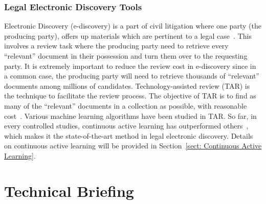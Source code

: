 \documentclass{svjour3}
\theoremstyle{break}
\begin{document}
\subsubsection{Legal Electronic Discovery Tools}
\label{sect: Electronic Discovery}

Electronic Discovery (e-discovery) is a part of civil litigation where one party (the producing party), offers up materials which are pertinent to a legal case~\cite{krishna2016bigse}. This involves a review task where the producing party need to retrieve every ``relevant'' document in their possession and turn them over to the requesting party. It is extremely important to reduce the review cost in e-discovery since in a common case, the producing party will need to retrieve thousands of ``relevant'' documents among millions of candidates. Technology-assisted review (TAR) is the technique to facilitate the review process. The objective of TAR is to find as many
of the ``relevant'' documents in a collection as possible, with reasonable cost~\cite{grossman2013}. Various machine learning algorithms have been studied in TAR. So far, in every controlled studies, continuous active learning has outperformed others~\cite{cormack2014evaluation,cormack2015autonomy}, which makes it the state-of-the-art method in legal electronic discovery. Details on continuous active learning will be provided in Section~\ref{sect: Continuous Active Learning}.




\section{Technical Briefing}
\label{sect: Technical Briefing}
\end{document}
